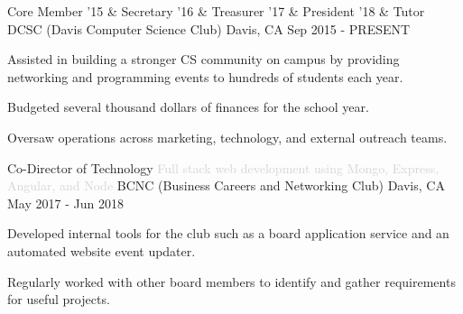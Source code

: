

\begin{cventries}

  \cventry
  {Core Member '15 \& Secretary '16 \& Treasurer '17 \& President '18 \& Tutor} %
  {DCSC (Davis Computer Science Club)} %
  {Davis, CA} %
  {Sep 2015 - PRESENT} %
  {
    \begin{cvitems} %
      \item {Assisted in building a stronger CS community on campus by providing networking and programming events to hundreds of students each year.}
      \item {Budgeted several thousand dollars of finances for the school year.}
      \item {Oversaw operations across marketing, technology, and external outreach teams.}
    \end{cvitems}
  }

  \cventry
  {Co-Director of Technology \textcolor{lightgray}{Full stack web development using Mongo, Express, Angular, and Node}} %
  {BCNC (Business Careers and Networking Club)} %
  {Davis, CA} %
  {May 2017 - Jun 2018} %
  {
    \begin{cvitems} %
      \item {Developed internal tools for the club such as a board application service and an automated website event updater.}
      \item {Regularly worked with other board members to identify and gather requirements for useful projects.}
    \end{cvitems}
  }
\end{cventries}
